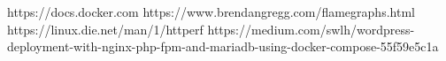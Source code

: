 
\begin{thebibliography}{99}  
https://docs.docker.com
https://www.brendangregg.com/flamegraphs.html
https://linux.die.net/man/1/httperf
https://medium.com/swlh/wordpress-deployment-with-nginx-php-fpm-and-mariadb-using-docker-compose-55f59e5c1a
\end{thebibliography}


